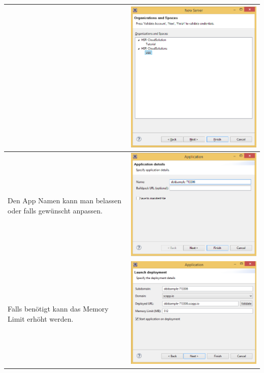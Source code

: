 \begin{longtable}{| p{5cm} | p{11cm} |}
&\includegraphics[width=0.65\columnwidth, valign=T]{images/ddd_cloud_deployment/4.png}
 \\ \hline 
Den App Namen kann man belassen oder falls gewünscht anpassen.
&\includegraphics[width=0.65\columnwidth, valign=T]{images/ddd_cloud_deployment/5.png}
 \\ \hline
Falls benötigt kann das Memory Limit erhöht werden.
&\includegraphics[width=0.65\columnwidth, valign=T]{images/ddd_cloud_deployment/6.png}

\end{longtable}
